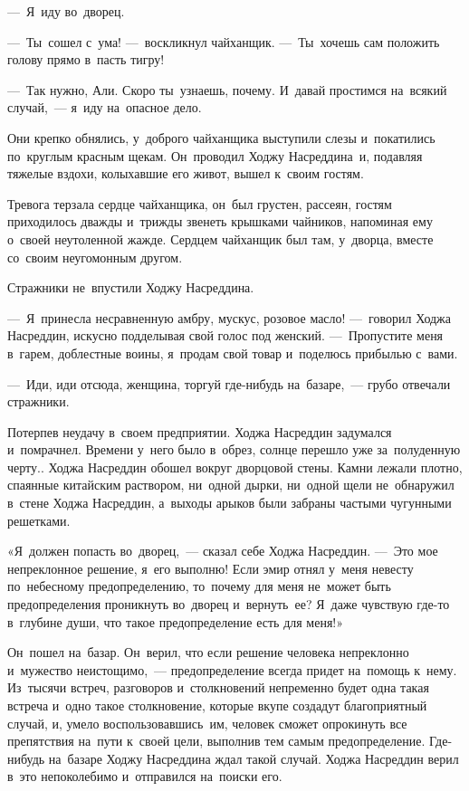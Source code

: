 \documentclass[12pt,a4paper]{book}
\begin{document}
—~Я~иду во~дворец.

—~Ты~сошел с~ума! —~воскликнул чайханщик. —~Ты~хочешь сам положить голову прямо в~пасть тигру!

—~Так нужно, Али. Скоро ты~узнаешь, почему. И~давай простимся на~всякий случай,~— я~иду на~опасное дело.

Они крепко обнялись, у~доброго чайханщика выступили слезы и~покатились по~круглым красным щекам. Он~проводил Ходжу Насреддина~и, подавляя тяжелые вздохи, колыхавшие его живот, вышел к~своим гостям.

Тревога терзала сердце чайханщика, он~был грустен, рассеян, гостям приходилось дважды и~трижды звенеть крышками чайников, напоминая ему о~своей неутоленной жажде. Сердцем чайханщик был там, у~дворца, вместе со~своим неугомонным другом.

Стражники не~впустили Ходжу Насреддина.

—~Я~принесла несравненную амбру, мускус, розовое масло! —~говорил Ходжа Насреддин, искусно подделывая свой голос под женский. —~Пропустите меня в~гарем, доблестные воины, я~продам свой товар и~поделюсь прибылью с~вами.

—~Иди, иди отсюда, женщина, торгуй где-нибудь на~базаре,~— грубо отвечали стражники.

Потерпев неудачу в~своем предприятии. Ходжа Насреддин задумался и~помрачнел. Времени у~него было в~обрез, солнце перешло уже за~полуденную черту.. Ходжа Насреддин обошел вокруг дворцовой стены. Камни лежали плотно, спаянные китайским раствором, ни~одной дырки, ни~одной щели не~обнаружил в~стене Ходжа Насреддин, а~выходы арыков были забраны частыми чугунными решетками.

«Я~должен попасть во~дворец,~— сказал себе Ходжа Насреддин. —~Это мое непреклонное решение, я~его выполню! Если эмир отнял у~меня невесту по~небесному предопределению, то~почему для меня не~может быть предопределения проникнуть во~дворец и~вернуть~ее? Я~даже чувствую где-то в~глубине души, что такое предопределение есть для меня!»

Он~пошел на~базар. Он~верил, что если решение человека непреклонно и~мужество неистощимо,~— предопределение всегда придет на~помощь к~нему. Из~тысячи встреч, разговоров и~столкновений непременно будет одна такая встреча и~одно такое столкновение, которые вкупе создадут благоприятный случай, и, умело воспользовавшись~им, человек сможет опрокинуть все препятствия на~пути к~своей цели, выполнив тем самым предопределение. Где-нибудь на~базаре Ходжу Насреддина ждал такой случай. Ходжа Насреддин верил в~это непоколебимо и~отправился на~поиски его.
\end{document}
